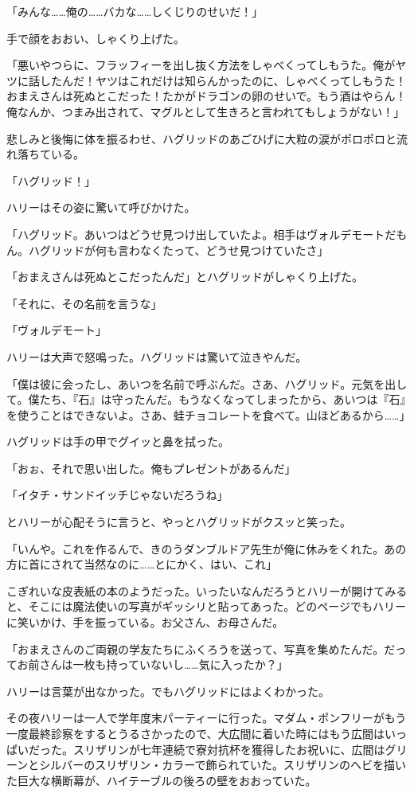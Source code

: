\documentclass[10pt,a4paper]{article}
\begin{document}
\begin{CJK}{UTF8}{min}
「みんな……俺の……バカな……しくじりのせいだ！」

手で顔をおおい、しゃくり上げた。

「悪いやつらに、フラッフィーを出し抜く方法をしゃべくってしもうた。俺がヤツに話したんだ！ヤツはこれだけは知らんかったのに、しゃべくってしもうた！おまえさんは死ぬとこだった！たかがドラゴンの卵のせいで。もう酒はやらん！俺なんか、つまみ出されて、マグルとして生きろと言われてもしょうがない！」

悲しみと後悔に体を振るわせ、ハグリッドのあごひげに大粒の涙がポロポロと流れ落ちている。

「ハグリッド！」

ハリーはその姿に驚いて呼びかけた。

「ハグリッド。あいつはどうせ見つけ出していたよ。相手はヴォルデモートだもん。ハグリッドが何も言わなくたって、どうせ見つけていたさ」

「おまえさんは死ぬとこだったんだ」とハグリッドがしゃくり上げた。

「それに、その名前を言うな」

「ヴォルデモート」

ハリーは大声で怒鳴った。ハグリッドは驚いて泣きやんだ。

「僕は彼に会ったし、あいつを名前で呼ぶんだ。さあ、ハグリッド。元気を出して。僕たち、『石』は守ったんだ。もうなくなってしまったから、あいつは『石』を使うことはできないよ。さあ、蛙チョコレートを食べて。山ほどあるから……」

ハグリッドは手の甲でグイッと鼻を拭った。

「おぉ、それで思い出した。俺もプレゼントがあるんだ」

「イタチ・サンドイッチじゃないだろうね」

とハリーが心配そうに言うと、やっとハグリッドがクスッと笑った。

「いんや。これを作るんで、きのうダンブルドア先生が俺に休みをくれた。あの方に首にされて当然なのに……とにかく、はい、これ」

こぎれいな皮表紙の本のようだった。いったいなんだろうとハリーが開けてみると、そこには魔法使いの写真がギッシリと貼ってあった。どのページでもハリーに笑いかけ、手を振っている。お父さん、お母さんだ。

「おまえさんのご両親の学友たちにふくろうを送って、写真を集めたんだ。だってお前さんは一枚も持っていないし……気に入ったか？」

ハリーは言葉が出なかった。でもハグリッドにはよくわかった。



その夜ハリーは一人で学年度末パーティーに行った。マダム・ポンフリーがもう一度最終診察をするとうるさかったので、大広間に着いた時にはもう広間はいっぱいだった。スリザリンが七年連続で寮対抗杯を獲得したお祝いに、広間はグリーンとシルバーのスリザリン・カラーで飾られていた。スリザリンのヘビを描いた巨大な横断幕が、ハイテーブルの後ろの壁をおおっていた。


\end{CJK}
\end{document}
